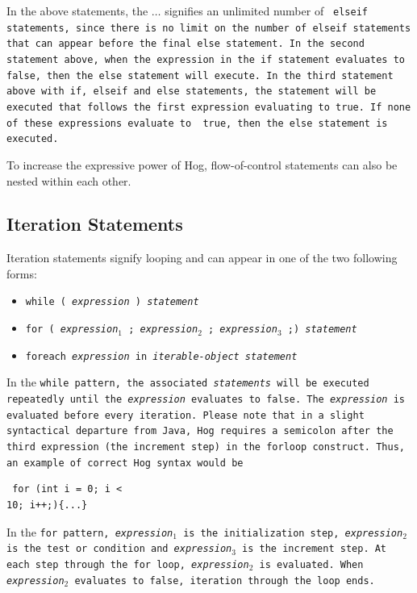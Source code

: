 \documentclass{report}
\begin{document}
In the above statements, the  $\dots$ signifies an unlimited number of \tt
elseif \rm statements, since there is no limit on the number of \tt elseif \rm
statements that can appear before the final \tt else \rm statement. In the
second statement above, when the expression in the \tt if \rm statement
evaluates to \tt false\rm, then the \tt else \rm statement will execute. In the
third statement above with \tt if\rm, \tt elseif \rm and \tt else \rm
statements, the statement will be executed that follows the first expression
evaluating to \tt true\rm. If none of these expressions evaluate to \tt
true\rm, then the \tt else \rm statement is executed.

To increase the expressive power of Hog, flow-of-control statements can also be
nested within each other.


\subsection{Iteration Statements} %
\label{sub:iteration_statements}

Iteration statements signify looping and can appear in one of the two following
forms:

\begin{itemize}
  \item[] \tt while ( \rm \emph{expression} \tt ) \rm \emph{statement}
  \item[] \tt for ( \rm \emph{expression}$_1$ \tt ; \rm \emph{expression}$_2$ \tt ; \rm \emph{expression}$_3$ \tt ;) \rm \emph{statement}
  \item[] \tt foreach \rm \emph{expression} \tt in \rm \emph{iterable-object statement}
\end{itemize}

In the \tt while \rm pattern, the associated \emph{statements} will be executed
repeatedly until the \emph{expression} evaluates to \tt false\rm. The
\emph{expression} is evaluated before every iteration. Please note that in a
slight syntactical departure from Java, Hog requires a semicolon after the
third expression (the increment step) in the \tt for\rm loop construct. Thus,
an example of correct Hog syntax would be \begin{verbatim} for (int i = 0; i <
10; i++;){...}\end{verbatim}

In the \tt for \rm pattern, \emph{expression}$_1$ is the initialization step,
\emph{expression}$_2$ is the test or condition and \emph{expression}$_3$ is the
increment step. At each step through the for loop, \emph{expression}$_2$ is
evaluated. When \emph{expression}$_2$ evaluates to false, iteration through the
loop ends.
\end{document}
